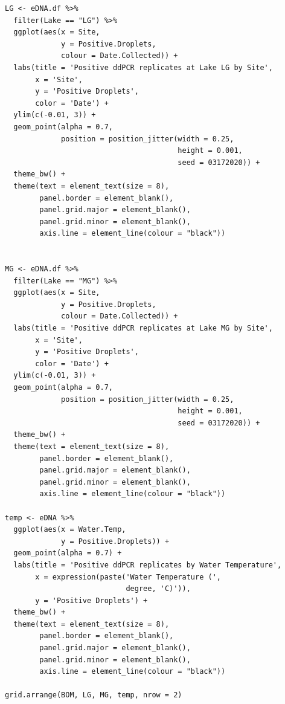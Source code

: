 \documentclass[12pt]{article}\usepackage[]{graphicx}\usepackage[]{color}
\makeatletter
\newenvironment{kframe}{%
 \def\at@end@of@kframe{}%
 \ifinner\ifhmode%
  \def\at@end@of@kframe{\end{minipage}}%
  \begin{minipage}{\columnwidth}%
 \fi\fi%
 \def\FrameCommand##1{\hskip\@totalleftmargin \hskip-\fboxsep
 \colorbox{shadecolor}{##1}\hskip-\fboxsep
     \hskip-\linewidth \hskip-\@totalleftmargin \hskip\columnwidth}%
 \MakeFramed {\advance\hsize-\width
   \@totalleftmargin\z@ \linewidth\hsize
   \@setminipage}}%
 {\par\unskip\endMakeFramed%
 \at@end@of@kframe}
\newenvironment{knitrout}{}{} %
\newenvironment{kframe}{%
 \def\at@end@of@kframe{}%
 \ifinner\ifhmode%
  \def\at@end@of@kframe{\end{minipage}}%
  \begin{minipage}{\columnwidth}%
 \fi\fi%
 \def\FrameCommand##1{\hskip\@totalleftmargin \hskip-\fboxsep
 \colorbox{shadecolor}{##1}\hskip-\fboxsep
     \hskip-\linewidth \hskip-\@totalleftmargin \hskip\columnwidth}%
 \MakeFramed {\advance\hsize-\width
   \@totalleftmargin\z@ \linewidth\hsize
   \@setminipage}}%
 {\par\unskip\endMakeFramed%
 \at@end@of@kframe}
\newenvironment{knitrout}{}{} %
\makeatother
\begin{document}
\begin{knitrout}
\begin{kframe}
\begin{verbatim}
LG <- eDNA.df %>% 
  filter(Lake == "LG") %>%
  ggplot(aes(x = Site, 
             y = Positive.Droplets, 
             colour = Date.Collected)) + 
  labs(title = 'Positive ddPCR replicates at Lake LG by Site', 
       x = 'Site', 
       y = 'Positive Droplets', 
       color = 'Date') +
  ylim(c(-0.01, 3)) + 
  geom_point(alpha = 0.7, 
             position = position_jitter(width = 0.25, 
                                        height = 0.001, 
                                        seed = 03172020)) + 
  theme_bw() + 
  theme(text = element_text(size = 8),
        panel.border = element_blank(), 
        panel.grid.major = element_blank(),
        panel.grid.minor = element_blank(), 
        axis.line = element_line(colour = "black"))


MG <- eDNA.df %>% 
  filter(Lake == "MG") %>%
  ggplot(aes(x = Site, 
             y = Positive.Droplets, 
             colour = Date.Collected)) + 
  labs(title = 'Positive ddPCR replicates at Lake MG by Site', 
       x = 'Site', 
       y = 'Positive Droplets', 
       color = 'Date') +
  ylim(c(-0.01, 3)) + 
  geom_point(alpha = 0.7, 
             position = position_jitter(width = 0.25, 
                                        height = 0.001, 
                                        seed = 03172020)) + 
  theme_bw() + 
  theme(text = element_text(size = 8),
        panel.border = element_blank(), 
        panel.grid.major = element_blank(),
        panel.grid.minor = element_blank(), 
        axis.line = element_line(colour = "black"))

temp <- eDNA %>% 
  ggplot(aes(x = Water.Temp, 
             y = Positive.Droplets)) +
  geom_point(alpha = 0.7) + 
  labs(title = 'Positive ddPCR replicates by Water Temperature', 
       x = expression(paste('Water Temperature (', 
                            degree, 'C)')), 
       y = 'Positive Droplets') +
  theme_bw() + 
  theme(text = element_text(size = 8),
        panel.border = element_blank(), 
        panel.grid.major = element_blank(),
        panel.grid.minor = element_blank(), 
        axis.line = element_line(colour = "black"))

grid.arrange(BOM, LG, MG, temp, nrow = 2)
\end{verbatim}
\end{kframe}
\end{knitrout}


\end{document}
